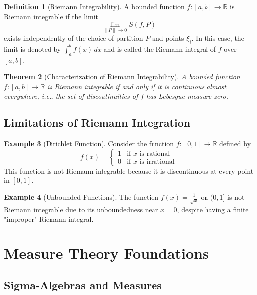 \documentclass[12pt,a4paper]{article}
\theoremstyle{plain}
\newtheorem{theorem}{Theorem}[section]
\theoremstyle{definition}
\newtheorem{definition}[theorem]{Definition}
\newtheorem{example}[theorem]{Example}
\begin{document}
\begin{definition}[Riemann Integrability]
A bounded function $f: [a,b] \to \mathbb{R}$ is Riemann integrable if the limit
\begin{equation}
\lim_{\|P\| \to 0} S(f, P)
\end{equation}
exists independently of the choice of partition $P$ and points $\xi_i$. In this case, the limit is denoted by $\int_a^b f(x) \, dx$ and is called the Riemann integral of $f$ over $[a,b]$.
\end{definition}

\begin{theorem}[Characterization of Riemann Integrability]
A bounded function $f: [a,b] \to \mathbb{R}$ is Riemann integrable if and only if it is continuous almost everywhere, i.e., the set of discontinuities of $f$ has Lebesgue measure zero.
\end{theorem}

\subsection{Limitations of Riemann Integration}

\begin{example}[Dirichlet Function]
Consider the function $f: [0,1] \to \mathbb{R}$ defined by
\begin{equation}
f(x) = 
\begin{cases}
1 & \text{if $x$ is rational} \\
0 & \text{if $x$ is irrational}
\end{cases}
\end{equation}
This function is not Riemann integrable because it is discontinuous at every point in $[0,1]$.
\end{example}

\begin{example}[Unbounded Functions]
The function $f(x) = \frac{1}{\sqrt{x}}$ on $(0,1]$ is not Riemann integrable due to its unboundedness near $x = 0$, despite having a finite "improper" Riemann integral.
\end{example}

\section{Measure Theory Foundations}

\subsection{Sigma-Algebras and Measures}
\end{document}
